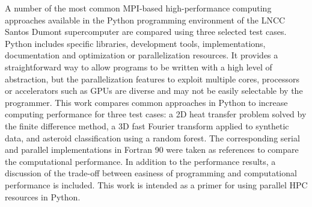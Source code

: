 
\begin{resumo}


\hypertarget{estilo:resumo}{} %

A number of the most common MPI-based high-performance computing approaches available in the Python programming environment of the LNCC Santos Dumont supercomputer are compared using three selected test cases. Python includes specific libraries, development tools, implementations, documentation and optimization or parallelization resources. It provides a straightforward way to allow programs to be written with a high level of abstraction, but the parallelization features to exploit multiple cores, processors or accelerators such as GPUs are diverse and may not be easily selectable by the programmer. This work compares common approaches in Python to increase computing performance for three test cases: a 2D heat transfer problem solved by the finite difference method, a 3D fast Fourier transform applied to synthetic data, and asteroid classification using a random forest. The corresponding serial and parallel implementations in Fortran 90 were taken as references to compare the computational performance. In addition to the performance results, a discussion of the trade-off between easiness of programming and computational performance is included. This work is intended as a primer for using parallel HPC resources in Python.

 
\end{resumo}
